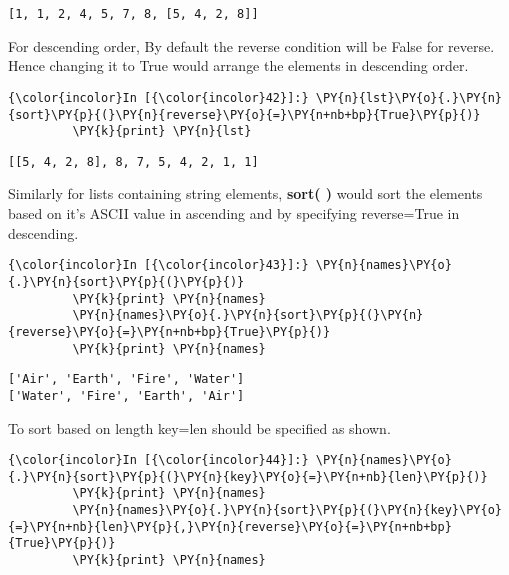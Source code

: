     \begin{Verbatim}[commandchars=\\\{\}]
[1, 1, 2, 4, 5, 7, 8, [5, 4, 2, 8]]
    \end{Verbatim}

    For descending order, By default the reverse condition will be False for
reverse. Hence changing it to True would arrange the elements in
descending order.

    \begin{Verbatim}[commandchars=\\\{\}]
{\color{incolor}In [{\color{incolor}42}]:} \PY{n}{lst}\PY{o}{.}\PY{n}{sort}\PY{p}{(}\PY{n}{reverse}\PY{o}{=}\PY{n+nb+bp}{True}\PY{p}{)}
         \PY{k}{print} \PY{n}{lst}
\end{Verbatim}

    \begin{Verbatim}[commandchars=\\\{\}]
[[5, 4, 2, 8], 8, 7, 5, 4, 2, 1, 1]
    \end{Verbatim}

    Similarly for lists containing string elements, \textbf{sort( )} would
sort the elements based on it's ASCII value in ascending and by
specifying reverse=True in descending.

    \begin{Verbatim}[commandchars=\\\{\}]
{\color{incolor}In [{\color{incolor}43}]:} \PY{n}{names}\PY{o}{.}\PY{n}{sort}\PY{p}{(}\PY{p}{)}
         \PY{k}{print} \PY{n}{names}
         \PY{n}{names}\PY{o}{.}\PY{n}{sort}\PY{p}{(}\PY{n}{reverse}\PY{o}{=}\PY{n+nb+bp}{True}\PY{p}{)}
         \PY{k}{print} \PY{n}{names}
\end{Verbatim}

    \begin{Verbatim}[commandchars=\\\{\}]
['Air', 'Earth', 'Fire', 'Water']
['Water', 'Fire', 'Earth', 'Air']
    \end{Verbatim}

    To sort based on length key=len should be specified as shown.

    \begin{Verbatim}[commandchars=\\\{\}]
{\color{incolor}In [{\color{incolor}44}]:} \PY{n}{names}\PY{o}{.}\PY{n}{sort}\PY{p}{(}\PY{n}{key}\PY{o}{=}\PY{n+nb}{len}\PY{p}{)}
         \PY{k}{print} \PY{n}{names}
         \PY{n}{names}\PY{o}{.}\PY{n}{sort}\PY{p}{(}\PY{n}{key}\PY{o}{=}\PY{n+nb}{len}\PY{p}{,}\PY{n}{reverse}\PY{o}{=}\PY{n+nb+bp}{True}\PY{p}{)}
         \PY{k}{print} \PY{n}{names}
\end{Verbatim}

